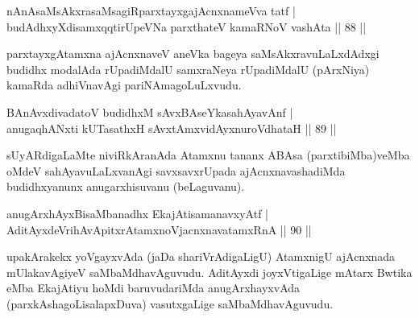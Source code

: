 
\begin{shl}
nAnAsaMsAkxrasaMsagiRparxtayxgajAcnxnameVva tatf | \\
budAdhxyXdisamxqqtirUpeVNa parxthateV kamaRNoV vashAta \hfill||  88 || 
\end{shl}

\begin{artha}
parxtayxgAtamxna ajAcnxnaveV aneVka bageya saMsAkxravuLaLxdAdxgi budidhx modalAda rUpadiMdalU samxraNeya rUpadiMdalU (pArxNiya) kamaRda adhiVnavAgi pariNAmagoLuLxvudu.
\end{artha}

\begin{shl}
BAnAvxdivadatoV budidhxM sAvxBAseYkasahAyavAnf | \\
anugaqhANxti kUTasathxH sAvxtAmxvidAyxnuroVdhataH \hfill||  89 ||  
\end{shl}

\begin{artha}
sUyARdigaLaMte niviRkAranAda Atamxnu tananx ABAsa (parxtibiMba)veMba oMdeV sahAyavuLaLxvanAgi savxsavxrUpada ajAcnxnavashadiMda budidhxyanunx anugarxhisuvanu (beLaguvanu).
\end{artha}



\begin{shl}
anugArxhAyxBisaMbanadhx EkajAtisamanavxyAtf |  \\
\footnotemark[1]{}AditAyxdeVrihAvApitxrAtamxnoV\s jacnxnavatamxRnA \hfill||  90 ||  
\end{shl}

\begin{artha}
upakArakekx yoVgayxvAda (jaDa shariVrAdigaLigU) AtamxnigU ajAcnxnada mUlakavAgiyeV saMbaMdhavAguvudu. AditAyxdi joyxVtigaLige mAtarx Bwtika eMba EkajAtiyu hoMdi baruvudariMda anugArxhayxvAda (parxkAshagoLisalapxDuva) vasutxgaLige saMbaMdhavAguvudu.
\end{artha}

